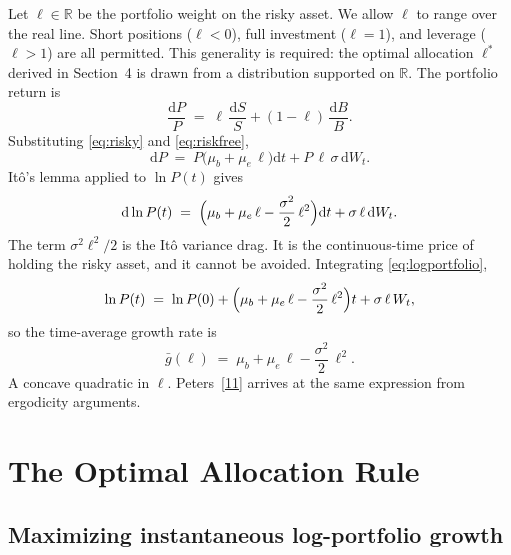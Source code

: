 \documentclass[11pt]{article}
\newcommand{\lopt}{\ell^{*}}
\newcommand{\mue}{\mu_{e}}
\newcommand{\mub}{\mu_{b}}
\newcommand{\dd}{\mathrm{d}}
\begin{document}
Let $\ell \in \mathbb{R}$ be the portfolio weight on the risky asset.
We allow $\ell$ to range over the real line. Short positions
($\ell < 0$), full investment ($\ell = 1$), and leverage ($\ell > 1$)
are all permitted. This generality is required: the optimal allocation
$\lopt$ derived in Section~4 is drawn from a distribution supported
on $\mathbb{R}$. The portfolio return is
\begin{equation}
  \frac{\dd P}{P} \;=\; \ell\,\frac{\dd S}{S}
  + (1-\ell)\,\frac{\dd B}{B}.
  \label{eq:portfolio}
\end{equation}
Substituting \eqref{eq:risky} and \eqref{eq:riskfree},
\begin{equation}
  \dd P \;=\; P\bigl(\mub + \mue\,\ell\bigr)\dd t
  + P\,\ell\,\sigma\,\dd W_{t}.
  \label{eq:portfoliosde}
\end{equation}
It\^{o}'s lemma applied to $\ln P(t)$ gives
\begin{equation}
  \dd\ln P(t) \;=\; \Bigl(\mub + \mue\,\ell
  - \frac{\sigma^{2}}{2}\,\ell^{2}\Bigr)\dd t
  + \sigma\,\ell\,\dd W_{t}.
  \label{eq:logportfolio}
\end{equation}
The term $\sigma^{2}\ell^{2}/2$ is the It\^{o} variance drag. It is
the continuous-time price of holding the risky asset, and it cannot
be avoided. Integrating \eqref{eq:logportfolio},
\begin{equation}
  \ln P(t) \;=\; \ln P(0) + \Bigl(\mub + \mue\,\ell
  - \frac{\sigma^{2}}{2}\,\ell^{2}\Bigr)t
  + \sigma\,\ell\,W_{t},
  \label{eq:logwealth}
\end{equation}
so the time-average growth rate is
\begin{equation}
  \bar{g}(\ell) \;=\; \mub + \mue\,\ell
  - \frac{\sigma^{2}}{2}\,\ell^{2}.
  \label{eq:growthrate}
\end{equation}
A concave quadratic in $\ell$. Peters~[\hyperlink{ref:11}{11}] arrives at the same
expression from ergodicity arguments.

\section{The Optimal Allocation Rule}

\subsection{Maximizing instantaneous log-portfolio growth}
\end{document}
